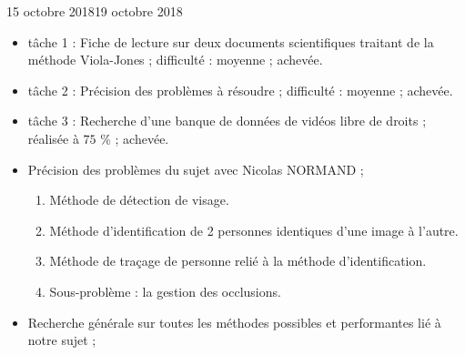 \documentclass[12pt]{fiche-rd-info}
\begin{document}

\begin{fichesuivi}{15 octobre 2018}{19 octobre 2018}

	\begin{travaileffectue}
		\begin{itemize}
			\item tâche 1 : Fiche de lecture sur deux documents scientifiques traitant de la méthode Viola-Jones ; difficulté : moyenne ; achevée.
			\item tâche 2 : Précision des problèmes à résoudre ; difficulté : moyenne ; achevée.
			\item tâche 3 : Recherche d'une banque de données de vidéos libre de droits ;  réalisée à  $75$ \% ; achevée.
		\end{itemize}
	\end{travaileffectue}


	\begin{echange}
		\begin{itemize}
			\item Précision des problèmes du sujet avec Nicolas NORMAND ;
				\begin{enumerate}
					\item Méthode de détection de visage.
					\item Méthode d'identification de 2 personnes identiques d'une image à l'autre.
					\item Méthode de traçage de personne relié à la méthode d'identification.
					\item Sous-problème : la gestion des occlusions.
				\end{enumerate}
			\item Recherche générale sur toutes les méthodes possibles et performantes lié à notre sujet ;
		\end{itemize}
	\end{echange}


\end{fichesuivi}
\end{document}
